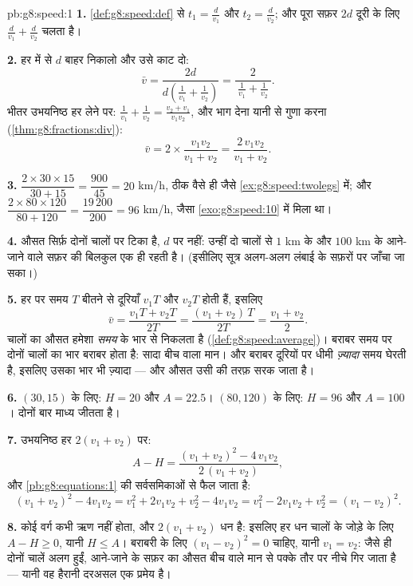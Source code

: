 \begin{solution}{pb:g8:speed:1}
\textbf{1.} \cref{def:g8:speed:def} से $t_1 = \frac{d}{v_1}$ और
$t_2 = \frac{d}{v_2}$; और पूरा सफ़र $2d$ दूरी के लिए
$\frac{d}{v_1} + \frac{d}{v_2}$ चलता है।

\textbf{2.} हर में से $d$ बाहर निकालो और उसे काट दो:
\[
\bar v
= \frac{2d}{d\left(\frac{1}{v_1} + \frac{1}{v_2}\right)}
= \frac{2}{\ \frac{1}{v_1} + \frac{1}{v_2}\ } .
\]
भीतर उभयनिष्ठ हर लेने पर:
$\frac{1}{v_1} + \frac{1}{v_2} = \frac{v_2 + v_1}{v_1 v_2}$, और भाग
देना यानी  से गुणा करना
(\cref{thm:g8:fractions:div}):
\[
\bar v = 2 \times \frac{v_1 v_2}{v_1 + v_2}
= \frac{2\, v_1 v_2}{v_1 + v_2} .
\]

\textbf{3.} $\dfrac{2 \times 30 \times 15}{30 + 15}
= \dfrac{900}{45} = 20$ km/h, ठीक वैसे ही जैसे
\cref{ex:g8:speed:twolegs} में; और
$\dfrac{2 \times 80 \times 120}{80 + 120} = \dfrac{19\,200}{200}
= 96$ km/h, जैसा \cref{exo:g8:speed:10} में मिला था।

\textbf{4.} औसत सिर्फ़ दोनों चालों पर टिका है, $d$ पर नहीं: उन्हीं
दो चालों से $1$ km के और $100$ km के आने-जाने वाले सफ़र की 
बिलकुल एक ही रहती है। (इसीलिए सूत्र अलग-अलग लंबाई के सफ़रों पर जाँचा
जा सका।)

\textbf{5.} हर  पर समय $T$ बीतने से दूरियाँ $v_1 T$ और $v_2 T$
होती हैं, इसलिए
\[
\bar v = \frac{v_1 T + v_2 T}{2T}
= \frac{(v_1 + v_2)\,T}{2T}
= \frac{v_1 + v_2}{2} .
\]
चालों का औसत हमेशा \emph{समय} के भार से निकलता है
(\cref{def:g8:speed:average})। बराबर समय पर दोनों चालों का भार
बराबर होता है: सादा बीच वाला मान। और बराबर दूरियों पर धीमी 
\emph{ज़्यादा} समय घेरती है, इसलिए उसका भार भी ज़्यादा --- और औसत
उसी की तरफ़ सरक जाता है।

\textbf{6.} $(30, 15)$ के लिए: $H = 20$ और $A = 22.5$। $(80, 120)$
के लिए: $H = 96$ और $A = 100$। दोनों बार  माध्य जीतता है।

\textbf{7.} उभयनिष्ठ हर $2(v_1 + v_2)$ पर:
\[
A - H
= \frac{(v_1 + v_2)^2 - 4\, v_1 v_2}{2\,(v_1 + v_2)} ,
\]
और  \cref{pb:g8:equations:1} की सर्वसमिकाओं से फैल जाता है:
\[
(v_1 + v_2)^2 - 4 v_1 v_2
= v_1^2 + 2 v_1 v_2 + v_2^2 - 4 v_1 v_2
= v_1^2 - 2 v_1 v_2 + v_2^2
= (v_1 - v_2)^2 .
\]

\textbf{8.} कोई वर्ग कभी ऋण नहीं होता, और $2(v_1 + v_2)$ धन है:
इसलिए हर धन चालों के जोड़े के लिए $A - H \geq 0$, यानी $H \leq A$।
बराबरी के लिए $(v_1 - v_2)^2 = 0$ चाहिए, यानी $v_1 = v_2$: जैसे ही
दोनों चालें अलग हुईं, आने-जाने के सफ़र का औसत बीच वाले मान से पक्के
तौर पर नीचे गिर जाता है --- यानी वह हैरानी दरअसल एक प्रमेय है।


\end{solution}
